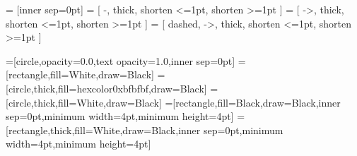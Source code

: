 \usepackage{tikz}

\usetikzlibrary{bayesnet}



\tikzset{>=latex}
   = [inner sep=0pt]
   = [ -, thick, shorten <=1pt, shorten >=1pt ]
  = [ ->, thick, shorten <=1pt, shorten >=1pt ]
 = [ dashed, ->, thick, shorten <=1pt, shorten >=1pt ]

=[circle,opacity=0.0,text opacity=1.0,inner sep=0pt]
=[rectangle,fill=White,draw=Black]
=[circle,thick,fill=hexcolor0xbfbfbf,draw=Black]
=[circle,thick,fill=White,draw=Black]
=[rectangle,fill=Black,draw=Black,inner sep=0pt,minimum width=4pt,minimum height=4pt]
=[rectangle,thick,fill=White,draw=Black,inner sep=0pt,minimum
width=4pt,minimum height=4pt]

\usepackage{pgfplots}                               %
\pgfplotsset{compat=newest}
\pgfplotsset{plot coordinates/math parser=false}
\newlength\figureheight
\newlength\figurewidth
\setlength\figureheight{1.75in}
\setlength\figurewidth{2.5in}


\newlength\figureheightsmall
\newlength\figurewidthsmall
\setlength\figureheightsmall{1.5in}
\setlength\figurewidthsmall{1.85in}

